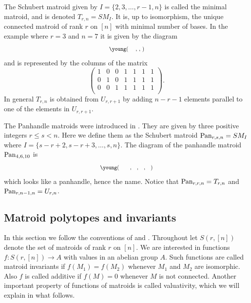 \begin{example}
    \label{ex:minimal}
    The Schubert matroid given by $I = \{2,3,\dots,r-1,n \}$ is called the minimal matroid, and is denoted $T_{r,n} = SM_I$. It is, up to isomorphism, the unique connected matroid of rank $r$ on $[n]$ with minimal number of bases. In the example where $r=3$ and $n=7$ it is given by the diagram
    \begin{equation*}
        \scalebox{0.8}{\young(~~~~,~,~)}
    \end{equation*}
    and is represented by the columns of the matrix
    \begin{equation*}
        \left(\begin{array}{ccccccc}
            1 & 0 & 0 & 1 & 1 & 1 & 1\\
            0 & 1 & 0 & 1 & 1 & 1 & 1\\
            0 & 0 & 1 & 1 & 1 & 1 & 1\\
        \end{array}\right).
    \end{equation*}
    In general $T_{r,n}$ is obtained from $U_{r,r+1}$ by adding $n-r-1$ elements parallel to one of the elements in $U_{r,r+1}$.
\end{example}
\begin{example}
    \label{ex:panhandle}
    The Panhandle matroids were introduced in \cite{HMMMNVYPanhandle}. They are given by three positive integers $r \leq s < n$. Here we define them as the Schubert matroid $\operatorname{\mathrm{Pan}}_{r,s,n} = SM_I$ where $I = \{s-r+2, s-r+3, \dots ,s, n\}$. The diagram of the panhandle matroid $\operatorname{\mathrm{Pan}}_{4,6,10}$ is
    \begin{equation*}
        \scalebox{0.8}{\young(~~~~~~,~~~,~~~,~~~)}
    \end{equation*}
    which looks like a panhandle, hence the name. Notice that $\operatorname{\mathrm{Pan}}_{r,r,n} = T_{r,n}$ and $\operatorname{\mathrm{Pan}}_{r,n-1,n} = U_{r,n}$.
\end{example}


\subsection{Matroid polytopes and invariants}
In this section we follow the conventions of \cite{DerksenFink} and \cite{FinkSpeyer}. Throughout let $S(r,[n])$ denote the set of matroids of rank $r$ on $[n]$. We are interested in functions $f\colon S(r,[n]) \to A$ with values in an abelian group $A$. Such functions are called matroid invariants if $f(M_1)=f(M_2)$ whenever $M_1$ and $M_2$ are isomorphic. Also $f$ is called additive if $f(M) = 0$ whenever $M$ is not connected. Another important property of functions of matroids is called valuativity, which we will explain in what follows.

